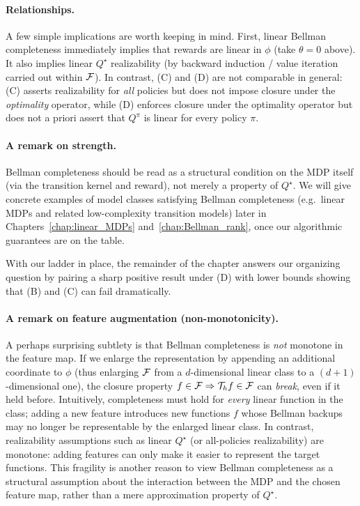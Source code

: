 \paragraph{Relationships.}
A few simple implications are worth keeping in mind.
First, linear Bellman completeness immediately implies that rewards are linear in $\phi$
(take $\theta=0$ above). It also implies linear $Q^\star$ realizability (by backward
induction / value iteration carried out within $\mathcal{F}$).
In contrast, (C) and (D) are not comparable in general: (C) asserts realizability for
\emph{all} policies but does not impose closure under the \emph{optimality} operator,
while (D) enforces closure under the optimality operator but does not a priori assert
that $Q^\pi$ is linear for every policy $\pi$.



\paragraph{A remark on strength.}
Bellman completeness should be read as a structural condition on the MDP itself (via the
transition kernel and reward), not merely a property of $Q^\star$.
We will give concrete examples of model classes satisfying Bellman completeness
(e.g.\ linear MDPs and related low-complexity transition models) later in
Chapters~\ref{chap:linear_MDPs} and~\ref{chap:Bellman_rank}, once our algorithmic
guarantees are on the table.

With our ladder in place, the remainder of the chapter answers our organizing question
by pairing a sharp positive result under (D) with lower bounds showing that (B) and (C)
can fail dramatically.

\paragraph{A remark on feature augmentation (non-monotonicity).}
A perhaps surprising subtlety is that Bellman completeness is \emph{not} monotone in the
feature map.
If we enlarge the representation by appending an additional coordinate to $\phi$
(thus enlarging $\mathcal{F}$ from a $d$-dimensional linear class to a $(d+1)$-dimensional one),
the closure property $f\in\mathcal{F} \Rightarrow \mathcal{T}_h f\in\mathcal{F}$ can \emph{break}, even if it held before.
Intuitively, completeness must hold for \emph{every} linear function in the class; adding
a new feature introduces new functions $f$ whose Bellman backups may no longer be
representable by the enlarged linear class.
In contrast, realizability assumptions such as linear $Q^\star$ (or all-policies
realizability) are monotone: adding features can only make it easier to represent the
target functions. This fragility is another reason to view Bellman completeness as a
structural assumption about the interaction between the MDP and the chosen feature map,
rather than a mere approximation property of $Q^\star$.

